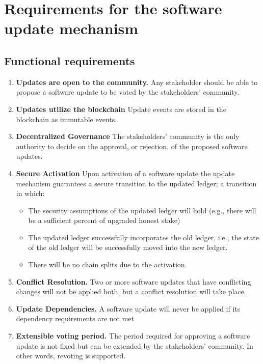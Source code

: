 \section{Requirements for the software update mechanism} \label{sec:requirements}

\subsection{Functional requirements} \label{sec:func-reqs}
\begin{enumerate}
\item \textbf{Updates are open to the community.} \label{req:upd-open} Any
  stakeholder should be able to propose a software update to be voted by the
  stakeholders' community.

\item \textbf{Updates utilize the blockchain} \label{req:upd-blockchain} Update
  events are stored in the blockchain as immutable events.

\item \textbf{Decentralized Governance} \label{req-dec-gov} The stakeholders'
  community is the only authority to decide on the approval, or rejection, of
  the proposed software updates.

\item \textbf{Secure Activation} \label{req-sec-act} Upon activation of a
  software update the update mechanism guarantees a secure transition to the
  updated ledger; a transition in which:
  \begin{itemize}
  \item The security assumptions of the updated ledger will hold (e.g., there
    will be a sufficient percent of upgraded honest stake)
  \item The updated ledger successfully incorporates the old ledger, i.e., the
    state of the old ledger will be successfully moved into the new ledger.
  \item There will be no chain splits due to the activation.
\end{itemize}

\item \textbf{Conflict Resolution.}\label{req:conflict-res} Two or more software
  updates that have conflicting changes will not be applied both, but a conflict
  resolution will take place.

\item \textbf{Update Dependencies.}\label{req:update-dep} A software update will
  never be applied if its dependency requirements are not met

\item \textbf{Extensible voting period.} \label{req:ext-vper} The period
  required for approving a software update is not fixed but can be extended by
  the stakeholders' community. In other words, revoting is supported.

\end{enumerate}

